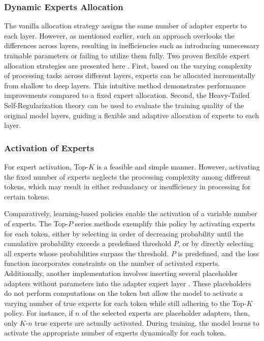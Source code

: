 \subsubsection{Dynamic Experts Allocation}
The vanilla allocation strategy assigns the same number of adapter experts to each layer. However, as mentioned earlier, such an approach overlooks the differences across layers, resulting in inefficiencies such as introducing unnecessary trainable parameters or failing to utilize them fully. Two proven flexible expert allocation strategies are presented here \cite{gao2024higher,qing2024alphalora}. First, based on the varying complexity of processing tasks across different layers, experts can be allocated incrementally from shallow to deep layers. This intuitive method demonstrates performance improvements compared to a fixed expert allocation. Second, the Heavy-Tailed Self-Regularization theory can be used to evaluate the training quality of the original model layers, guiding a flexible and adaptive allocation of experts to each layer.

\subsubsection{Activation of Experts}
For expert activation, Top-$K$ is a feasible and simple manner. However, activating the fixed number of experts neglects the processing complexity among different tokens, which may result in either redundancy or insufficiency in processing for certain tokens. 

Comparatively, learning-based policies enable the activation of a variable number of experts. 
The Top-$P$ series methods exemplify this policy by activating experts for each token, either by selecting in order of decreasing probability until the cumulative probability exceeds a predefined threshold $P$, or by directly selecting all experts whose probabilities surpass the threshold. $P$ is predefined, and the loss function incorporates constraints on the number of activated experts. Additionally, another implementation involves inserting several placeholder adapters without parameters into the adapter expert layer \cite{zeng2024adamoe}. These placeholders do not perform computations on the token but allow the model to activate a varying number of true experts for each token while still adhering to the Top-$K$ policy. For instance, if $n$ of the selected experts are placeholder adapters, then, only $K$-$n$ true experts are actually activated. During training, the model learns to activate the appropriate number of experts dynamically for each token.

